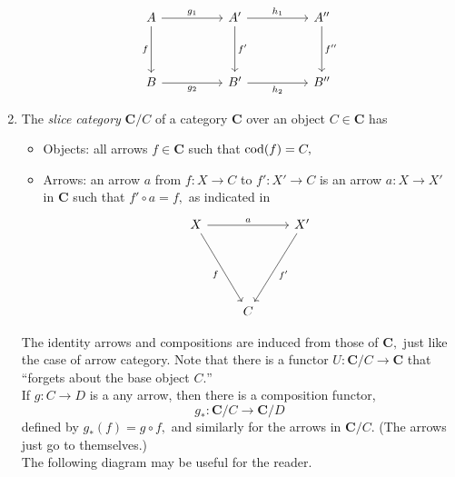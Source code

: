 \begin{enumerate}
	\begin{equation*} 
		\begin{tikzcd}
		A \arrow[dd, "f"'] \arrow[rr, "g_1"] &  & A' \arrow[dd, "f'"] \arrow[rr, "h_1"] &  & A'' \arrow[dd, "f''"] \\
		                                     &  &                                       &  &                       \\
		B \arrow[rr, "g_2"']                 &  & B' \arrow[rr, "h_2"']                 &  & B''                  
		\end{tikzcd}
	\end{equation*}
	\item The \emph{slice category} $\mathbf{C}/C$ of a category $\mathbf{C}$ over an object $C \in \mathbf{C}$ has
	\begin{itemize}
		\item Objects: all arrows $f \in \mathbf{C}$ such that $\operatorname{cod}(f) = C,$
		\item Arrows: an arrow $a$ from $f:X\to C$ to $f':X' \to C$ is an arrow $a: X\to X'$ in $\mathbf{C}$ such that $f'\circ a = f,$ as indicated in
		\begin{equation*} 
			\begin{tikzcd}
			X \arrow[rddd, "f"'] \arrow[rr, "a"] &     & X' \arrow[lddd, "f'"] \\
			                                       &     &                   \\
			                                       &     &                   \\
			                                       &  C  &                      
			\end{tikzcd}
		\end{equation*}
	\end{itemize}
	The identity arrows and compositions are induced from those of $\mathbf{C},$ just like the case of arrow category. Note that there is a functor $U:\mathbf{C}/C \to \mathbf{C}$ that ``forgets about the base object $C.$''\\
	If $g:C\to D$ is a any arrow, then there is a composition functor,
	\begin{equation*} 
		g_*:\mathbf{C}/C \to \mathbf{C}/D
	\end{equation*}
	defined by $g_*(f) = g\circ f,$ and similarly for the arrows in $\mathbf{C}/C.$ (The arrows just go to themselves.)\\
	The following diagram may be useful for the reader.
	\begin{equation*} 

\end{equation*}
\end{enumerate}

